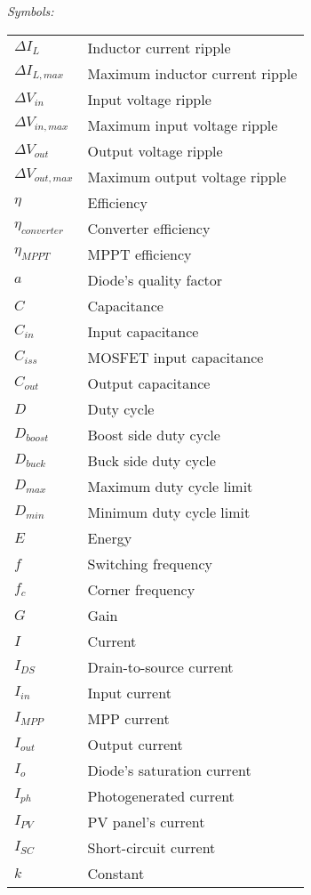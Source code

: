 \vspace{5mm} %
\newpage
\noindent\textit{Symbols:}\newline
\begin{tabular}{ll}
$\Delta I_{L}$ & Inductor current ripple\\
$\Delta I_{L,max}$ & Maximum inductor current ripple\\
$\Delta V_{in}$ & Input voltage ripple\\
$\Delta V_{in,max}$ & Maximum input voltage ripple\\
$\Delta V_{out}$ & Output voltage ripple\\
$\Delta V_{out,max}$ & Maximum output voltage ripple\\
$\eta$ & Efficiency\\
$\eta_{converter}$ & Converter efficiency\\
$\eta_{MPPT}$ & MPPT efficiency\\
$a$ & Diode's quality factor \\
$C$ & Capacitance\\
$C_{in}$ & Input capacitance\\
$C_{iss}$ & MOSFET input capacitance \\ 
$C_{out}$ & Output capacitance\\
$D$ & Duty cycle\\
$D_{boost}$ & Boost side duty cycle\\
$D_{buck}$ & Buck side duty cycle\\
$D_{max}$  & Maximum duty cycle limit \\
$D_{min}$  & Minimum duty cycle limit \\ 
$E$ & Energy\\
$f$ & Switching frequency\\
$f_{c}$ & Corner frequency \\
$G$ & Gain \\
$I$ & Current\\
$I_{DS}$ & Drain-to-source current \\
$I_{in}$ & Input current \\
$I_{MPP}$ & MPP current\\
$I_{out}$ & Output current \\
$I_{o}$ & Diode's saturation current \\
$I_{ph}$ & Photogenerated current \\
$I_{PV}$ & PV panel's current \\
$I_{SC}$ & Short-circuit current\\
$k$ & Constant \\

\end{tabular}
